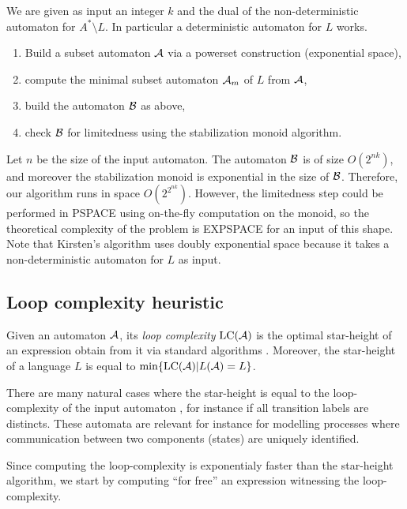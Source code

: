 \begin{framed}
We are given as input an integer $k$ and the dual of the non-deterministic automaton for $A^*\setminus L$. In particular a deterministic automaton for $L$ works.
\begin{enumerate}
	\item Build a subset automaton $\mathcal{A}$ via a powerset construction (exponential space),
	\item compute the minimal subset automaton $\mathcal{A}_m$ of $L$ from $\mathcal{A}$,
	\item build the automaton $\mathcal B$ as above,
	\item check $\mathcal B$ for limitedness using the stabilization monoid algorithm.
\end{enumerate}
\end{framed}

Let $n$ be the size of the input automaton.
The automaton $\mathcal B$ is of size $O(2^{nk})$, and moreover the stabilization monoid is exponential in the size of $\mathcal B$.
Therefore, our algorithm runs in space $O(2^{2^{nk}})$. However, the limitedness step could be performed in PSPACE using on-the-fly computation on the monoid, 
so the theoretical complexity of the problem is EXPSPACE for an input of this shape. 
Note that Kirsten's algorithm uses doubly exponential space because it takes a non-deterministic automaton for $L$ as input.

\subsection{Loop complexity heuristic}

\newcommand{\lc}{\mathrm{LC}}

Given an automaton $\mathcal{A}$, its \emph{loop complexity} $\lc(\A)$ is the optimal star-height of an expression obtain from it via standard algorithms \cite{Eggan63}. Moreover, the star-height of a language $L$ is equal to $\min\{\lc(\A)| L(\A)=L\}$.

There are many natural cases where the star-height is equal to the loop-complexity of the input automaton \cite{Cohen70}, for instance if all transition labels are distincts. These automata are relevant for instance for modelling processes where communication between two components (states) are uniquely identified. 

Since computing the loop-complexity is exponentialy faster than the star-height algorithm, we start by computing ``for free'' an expression witnessing the loop-complexity.

